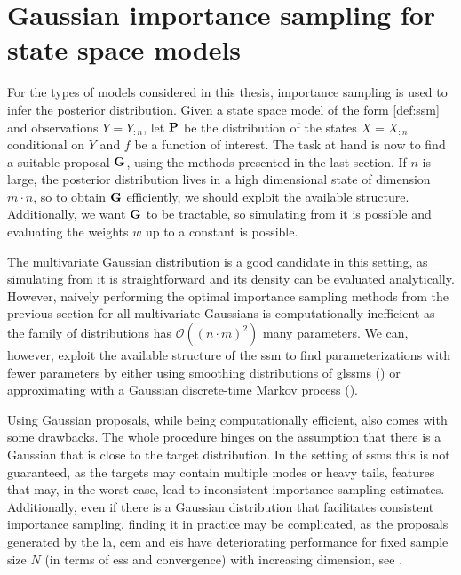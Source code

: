 \section{Gaussian importance sampling for state space models}
\label{sec:gaussian_importance_sampling_for_state_space_models}

For the types of models considered in this thesis, importance sampling is used to infer the posterior distribution. Given a state space model of the form \eqref{def:ssm} and observations $Y = Y_{:n}$, let $\P$ be the distribution of the states $X=X_{:n}$ conditional on $Y$ and $f$ be a function of interest. The task at hand is now to find a suitable proposal $\G$, using the methods presented in the last section. If $n$ is large, the posterior distribution lives in a high dimensional state of dimension $m\cdot n$, so to obtain $\G$ efficiently, we should exploit the available structure. Additionally, we want $\G$ to be tractable, so simulating from it is possible and evaluating the weights $w$ up to a constant is possible. 

The multivariate Gaussian distribution is a good candidate in this setting, as simulating from it is straightforward and its density can be evaluated analytically. However, naively performing the optimal importance sampling methods from the previous section for all multivariate Gaussians is computationally inefficient as the family of distributions has $\mathcal O((n\cdot m)^{2})$ many parameters. We can, however, exploit the available structure of the \gls{ssm} to find parameterizations with fewer parameters by either using smoothing distributions of \glspl{glssm} () or approximating with a Gaussian discrete-time Markov process (). 

Using Gaussian proposals, while being computationally efficient, also comes with some drawbacks. The whole procedure hinges on the assumption that there is a Gaussian that is close to the target distribution. In the setting of \glspl{ssm} this is not guaranteed, as the targets may contain multiple modes or heavy tails, features that may, in the worst case, lead to inconsistent importance sampling estimates.
Additionally, even if there is a Gaussian distribution that facilitates consistent importance sampling, finding it in practice may be complicated, as the proposals generated by the \gls{la}, \gls{cem} and \gls{eis} have deteriorating performance for fixed sample size $N$ (in terms of \gls{ess} and convergence) with increasing dimension, see .

